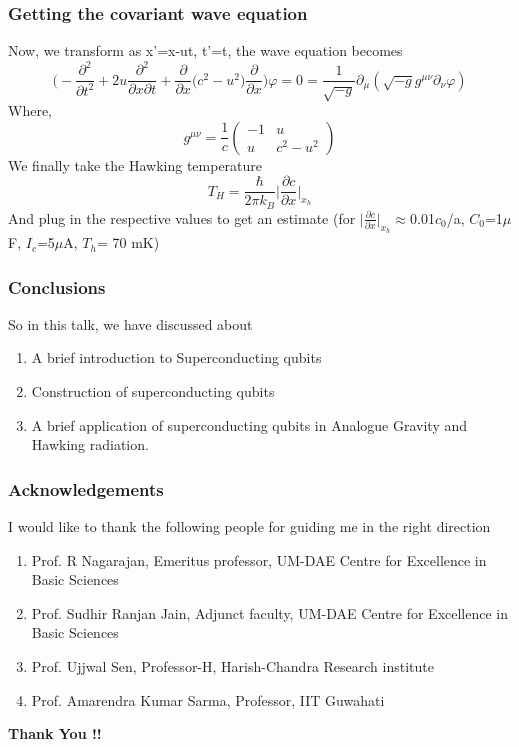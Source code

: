 \documentclass[11pt]{beamer}
\begin{document}
		\begin{frame}
		\frametitle{Getting the covariant wave equation}
Now, we transform as x'=x-ut, t'=t, the wave equation becomes 
\[\bigg(-\frac{\partial^2}{\partial t^2}+2u\frac{\partial^2}{\partial x\partial t}+\frac{\partial}{\partial x}\big(c^2-u^2\big)\frac{\partial}{\partial x}\bigg)\varphi=0=\frac{1}{\sqrt{-g}}\partial_\mu(\sqrt{-g}g^{\mu\nu}\partial_\nu\varphi)\]
Where,
\[ g^{\mu\nu}=\frac{1}{c}
\begin{pmatrix}
	-1 & u \\
	u & c^2-u^2 
\end{pmatrix}
\]
We finally take the Hawking temperature
\[T_H=\frac{\hbar}{2\pi k_B}\bigg|\frac{\partial c}{\partial x}\bigg|_{x_h}\]
And plug in the respective values to get an estimate (for $\bigg|\frac{\partial c}{\partial x}\bigg|_{x_h}$$\approx$0.01$c_0$/a, $C_0$=1$\mu$ F, $I_c$=5$\mu$A, $T_h$= 70 mK)
 
	\end{frame}
	
		\begin{frame}
		\frametitle{Conclusions}
		So in this talk, we have discussed about
		\begin{enumerate}
			\item A brief introduction to Superconducting qubits
			\item  Construction of superconducting qubits
			\item  A brief application of superconducting qubits in Analogue Gravity and Hawking radiation.
			
		\end{enumerate}
	\end{frame}
	
			\begin{frame}
		\frametitle{Acknowledgements}
		I would like to thank the following people for guiding me in the right direction
		\begin{enumerate}
			\item Prof. R Nagarajan, Emeritus professor, UM-DAE Centre for Excellence in Basic Sciences
			\item Prof. Sudhir Ranjan Jain, Adjunct faculty, UM-DAE Centre for Excellence in Basic Sciences
			\item Prof. Ujjwal Sen, Professor-H, Harish-Chandra Research institute
			\item  Prof. Amarendra Kumar Sarma, Professor, IIT Guwahati
		\end{enumerate}
	\end{frame}
	
	\begin{frame}
		\begin{center}
			\LARGE\textbf{Thank You !!}
		\end{center}
	
	\end{frame}
\end{document}
